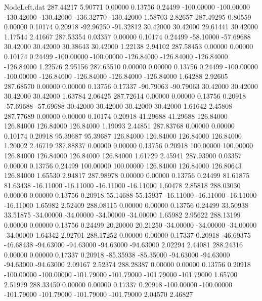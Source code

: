 \begin{filecontents}{NodeLeft.dat}
 287.44217    5.90771    0.00000     0.13756    0.24499 -100.00000 -100.00000 -130.42000 -130.42000 -136.32770 -130.42000    1.58703    2.82657
 287.49295    0.80559    0.00000     0.10174    0.20918  -92.96250  -91.32812   30.42000   30.42000   29.61441   30.42000    1.17544    2.41667
 287.53354    0.03357    0.00000     0.10174    0.24499  -58.10000  -57.69688   30.42000   30.42000   30.38643   30.42000    1.22138    2.94102
 287.58453    0.00000    0.00000     0.10174    0.24499 -100.00000 -100.00000 -126.84000 -126.84000 -126.84000 -126.84000    1.22576    2.95156
 287.63510    0.00000    0.00000     0.13756    0.24499 -100.00000 -100.00000 -126.84000 -126.84000 -126.84000 -126.84000    1.64288    2.92605
 287.68570    0.00000    0.00000     0.13756    0.17337  -90.79063  -90.79063   30.42000   30.42000   30.42000   30.42000    1.63784    2.06425
 287.72614    0.00000    0.00000     0.13756    0.20918  -57.69688  -57.69688   30.42000   30.42000   30.42000   30.42000    1.61642    2.45808
 287.77689    0.00000    0.00000     0.10174    0.20918   41.29688   41.29688  126.84000  126.84000  126.84000  126.84000    1.19093    2.44851
 287.83768    0.00000    0.00000     0.10174    0.20918   95.39687   95.39687  126.84000  126.84000  126.84000  126.84000    1.20002    2.46719
 287.88837    0.00000    0.00000     0.13756    0.20918  100.00000  100.00000  126.84000  126.84000  126.84000  126.84000    1.61729    2.45941
 287.93900    0.03357    0.00000     0.13756    0.24499  100.00000  100.00000  126.84000  126.84000  126.80643  126.84000    1.65530    2.94817
 287.98978    0.00000    0.00000     0.13756    0.24499   81.61875   81.63438  -16.11000  -16.11000  -16.11000  -16.11000    1.60478    2.85818
 288.03030    0.00000    0.00000     0.13756    0.20918   55.14688   55.15937  -16.11000  -16.11000  -16.11000  -16.11000    1.65982    2.52409
 288.08115    0.00000    0.00000     0.13756    0.24499   33.50938   33.51875  -34.00000  -34.00000  -34.00000  -34.00000    1.65982    2.95622
 288.13199    0.00000    0.00000     0.13756    0.24499   20.20000   20.21250  -34.00000  -34.00000  -34.00000  -34.00000    1.64342    2.92701
 288.17252    0.00000    0.00000     0.17337    0.20918  -46.69375  -46.68438  -94.63000  -94.63000  -94.63000  -94.63000    2.02294    2.44081
 288.24316    0.00000    0.00000     0.17337    0.20918  -85.35938  -85.35000  -94.63000  -94.63000  -94.63000  -94.63000    2.09167    2.52374
 288.28387    0.00000    0.00000     0.13756    0.20918 -100.00000 -100.00000 -101.79000 -101.79000 -101.79000 -101.79000    1.65700    2.51979
 288.33450    0.00000    0.00000     0.17337    0.20918 -100.00000 -100.00000 -101.79000 -101.79000 -101.79000 -101.79000    2.04570    2.46827

\end{filecontents}
